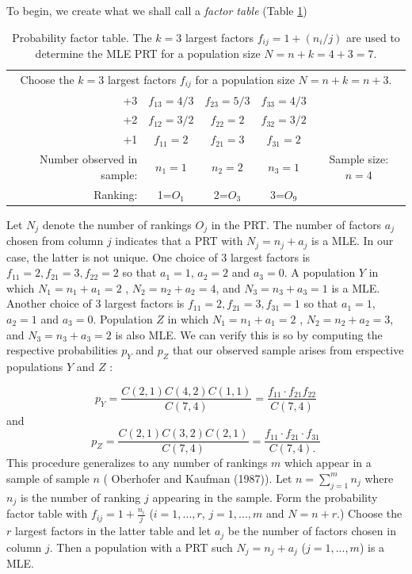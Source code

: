 \documentclass[a4paper, 12pt]{article}
\begin{document}
To begin, we create what we shall call a \emph{factor table} (Table \ref{FT}) 
\begin{table}[!htpb]
	\scriptsize
	\centering
	\begin{tabular}{r|ccc|c}\hline
		\multicolumn{5}{c}{Choose the $k=3$ largest factors $f_{ij}$ for a population size $N=n+k=n+3$.}\\ 
		+3& $f_{13}=4/3$ & $f_{23}=5/3$&$f_{33}=4/3$&\\
		+2& $f_{12}=3/2$ & $f_{22}=2$ &$f_{32}=3/2 $&\\
		+1& $f_{11}=2$  &$f_{21}=3$&$f_{31}=2 $ &\\\hline
		Number observed in sample:&$n_1=1$& $n_2=2$ & $n_3=1$ & Sample size: $n=4$\\\hline
		Ranking:&1=$O_1$&2=$O_3$&3=$O_9$
	\end{tabular}
	\caption{Probability factor table. The $k=3$ largest factors $f_{ij}=1+(n_i/j)$ are used to determine the MLE PRT for a population size $N=n+k=4+3=7$. }
	\label{FT}
\end{table}
{\flushleft  Let} $N_j$ denote the number of rankings $O_j$ in the PRT.  The number of factors $a_j$ chosen from column $j$ indicates that a  PRT with $N_j= n_j+a_j$ is a MLE.    In our case, the latter is not unique.  One choice of 3 largest factors is $f_{11}=2, f_{21}=3,f_{22}=2$ so that $a_1=1$, $a_2=2$ and $a_3=0$. A population $Y$ in which $N_1=n_1+a_1=2$ , $N_2=n_2+a_2=4$, and $N_3=n_3+a_3=1$ is a MLE. Another choice of 3 largest factors  is $f_{11}=2, f_{21}=3,f_{31}=1$ so that $a_1=1$, $a_2=1$ and $a_3=0$. Population $Z$ in which $N_1=n_1+a_1=2$ , $N_2=n_2+a_2=3$, and $N_3=n_3+a_3=2$ is also MLE. We can verify this is so by computing the respective probabilities $p_Y$ and $p_Z$ that our observed sample arises from erspective populations $Y$ and $Z$ :

\begin{equation}
p_Y=\frac{C(2,1)C(4,2)C(1,1)}{C(7,4)}=\frac{f_{11} \cdot f_{21}f_{22}}{C(7,4)}
\end{equation}
{\flushleft and }
\begin{equation}
p_Z=\frac{C(2,1)C(3,2)C(2,1)}{C(7,4)}=\frac{f_{11}\cdot f_{21}\cdot f_{31}}{C(7,4).}
\end{equation}
{\flushleft This} procedure generalizes to any number of rankings $m$ which appear in a sample of sample $n$ ( Oberhofer and Kaufman (1987)). Let $n=\sum_{j=1}^m n_j$ where $n_j$ is the number of ranking $j$ appearing in the sample.  Form the probability factor table with $f_{ij}=1+\frac{n_i}{j}$ ($i=1,...,r$, $j=1,...,m$ and $N=n+r$.)  Choose the $r$ largest factors in the latter table and let $a_j$ be the number of factors chosen in column $j$.  Then a population with a PRT such  $N_j=n_j+a_j$ ($j=1,...,m$) is a MLE. 
\end{document}
